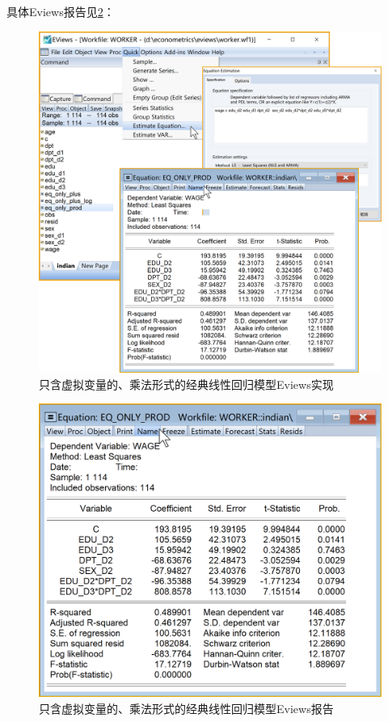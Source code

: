 \documentclass[12pt,(landscape,a4paper),(portrait,a4paper)]{article}
\theoremstyle{definition}
\theoremstyle{definition}
\theoremstyle{definition}
\theoremstyle{remark}
\begin{document}
具体Eviews报告见\ref{fig:only-prod-report}：

\begin{figure}

{\centering \includegraphics[width=27.57in]{picture/lab8-dummy-model/2-only-prod} 

}

\caption{只含虚拟变量的、乘法形式的经典线性回归模型Eviews实现}\label{fig:only-prod}
\end{figure}

\begin{figure}

{\centering \includegraphics[width=19.24in]{picture/lab8-dummy-model/2-only-prod-report} 

}

\caption{只含虚拟变量的、乘法形式的经典线性回归模型Eviews报告}\label{fig:only-prod-report}
\end{figure}
\end{document}
